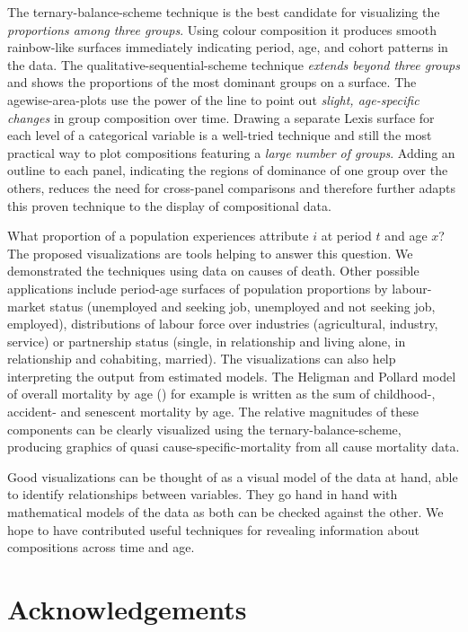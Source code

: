 \documentclass[parskip=half]{scrartcl}
\begin{document}
The ternary-balance-scheme technique is the best candidate for visualizing the \emph{proportions among three groups}. Using colour composition it produces smooth rainbow-like surfaces immediately indicating period, age, and cohort patterns in the data. The qualitative-sequential-scheme technique \emph{extends beyond three groups} and shows the proportions of the most dominant groups on a surface. The agewise-area-plots use the power of the line to point out \emph{slight, age-specific changes} in group composition over time. Drawing a separate Lexis surface for each level of a categorical variable is a well-tried technique and still the most practical way to plot compositions featuring a \emph{large number of groups}. Adding an outline to each panel, indicating the regions of dominance of one group over the others, reduces the need for cross-panel comparisons and therefore further adapts this proven technique to the display of compositional data.

What proportion of a population experiences attribute $i$ at period $t$ and age $x$? The proposed visualizations are tools helping to answer this question. We demonstrated the techniques using data on causes of death. Other possible applications include period-age surfaces of population proportions by labour-market status (unemployed and seeking job, unemployed and not seeking job, employed), distributions of labour force over industries (agricultural, industry, service) or partnership status (single, in relationship and living alone, in relationship and cohabiting, married). The visualizations can also help interpreting the output from estimated models. The Heligman and Pollard model of overall mortality by age (\cite{Heligman1980}) for example is written as the sum of childhood-, accident- and senescent mortality by age. The relative magnitudes of these components can be clearly visualized using the ternary-balance-scheme, producing graphics of quasi cause-specific-mortality from all cause mortality data.

Good visualizations can be thought of as a visual model of the data at hand, able to identify relationships between variables. They go hand in hand with mathematical models of the data as both can be checked against the other. We hope to have contributed useful techniques for revealing information about compositions across time and age.

\clearpage

\section{Acknowledgements} %
\label{sec:ack}
\end{document}
